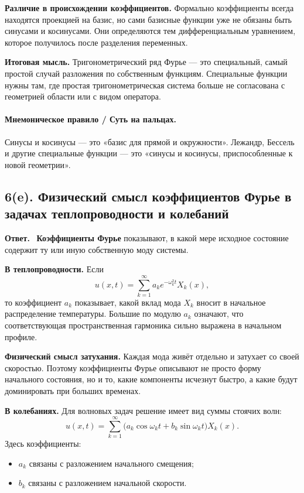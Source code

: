 \documentclass[a4paper,12pt]{article}
\newcommand{\Answer}{\textbf{Ответ.}\ }
\begin{document}
\textbf{Различие в происхождении коэффициентов.}
Формально коэффициенты всегда находятся проекцией на базис, но сами базисные функции уже не обязаны быть синусами и косинусами. Они определяются тем дифференциальным уравнением, которое получилось после разделения переменных.

\textbf{Итоговая мысль.}
Тригонометрический ряд Фурье --- это специальный, самый простой случай разложения по собственным функциям. Специальные функции нужны там, где простая тригонометрическая система больше не согласована с геометрией области или с видом оператора.

\paragraph{Мнемоническое правило / Суть на пальцах.}
Синусы и косинусы --- это «базис для прямой и окружности». Лежандр, Бессель и другие специальные функции --- это «синусы и косинусы, приспособленные к новой геометрии».

\subsection*{6(e). Физический смысл коэффициентов Фурье в задачах теплопроводности и колебаний}

\Answer
\textbf{Коэффициенты Фурье} показывают, в какой мере исходное состояние содержит ту или иную собственную моду системы.

\textbf{В теплопроводности.}
Если
\[
u(x,t)=\sum_{k=1}^{\infty}a_k e^{-\omega_k^2 t}X_k(x),
\]
то коэффициент $a_k$ показывает, какой вклад мода $X_k$ вносит в начальное распределение температуры. Большие по модулю $a_k$ означают, что соответствующая пространственная гармоника сильно выражена в начальном профиле.

\textbf{Физический смысл затухания.}
Каждая мода живёт отдельно и затухает со своей скоростью. Поэтому коэффициенты Фурье описывают не просто форму начального состояния, но и то, какие компоненты исчезнут быстро, а какие будут доминировать при больших временах.

\textbf{В колебаниях.}
Для волновых задач решение имеет вид суммы стоячих волн:
\[
u(x,t)=\sum_{k=1}^{\infty}
\bigl(a_k\cos \omega_k t+b_k\sin \omega_k t\bigr)X_k(x).
\]
Здесь коэффициенты:
\begin{itemize}
  \item $a_k$ связаны с разложением начального смещения;
  \item $b_k$ связаны с разложением начальной скорости.
\end{itemize}
\end{document}
